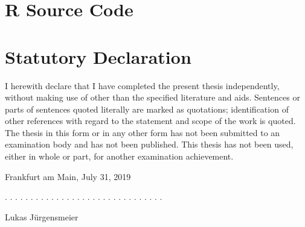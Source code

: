 \documentclass[12pt,a4paper]{article}
\begin{document}
\section{R Source Code}
%
%
%
%

\clearpage


\newpage
\thispagestyle{empty}
\section*{Statutory Declaration}\label{statutory-declaration}

I herewith declare that I have completed the present thesis independently, without making use of
other than the specified literature and aids. Sentences or parts of sentences quoted literally are
marked as quotations; identification of other references with regard to the statement and scope of
the work is quoted. The thesis in this form or in any other form has not been submitted to an examination body and has not been published.
This thesis has not been used, either in whole or part, for another examination achievement.

\vspace{1cm}

Frankfurt am Main, July 31, 2019
\vspace{2cm}

. . . . . . . . . . . . . . . . . . . . . . . . . . . . . . .
\vspace{0.1cm}

Lukas J\"urgensmeier
\end{document}
